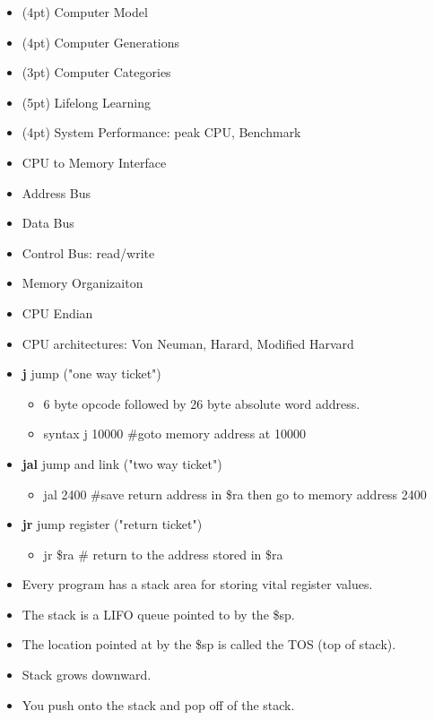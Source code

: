 
\begin{itemize}
\item (4pt) Computer Model
\item (4pt) Computer Generations
\item (3pt) Computer Categories
\item (5pt) Lifelong Learning
\item (4pt) System Performance: peak CPU, Benchmark
\end{itemize}

\begin{itemize}
\item CPU to Memory Interface
\item Address Bus
\item Data Bus
\item Control Bus: read/write
\item Memory Organizaiton
\item CPU Endian
\item CPU architectures: Von Neuman, Harard, Modified Harvard
\end{itemize}

\begin{itemize}
\item \textbf{j} jump ("one way ticket")
    \begin{itemize}
        \item 6 byte opcode followed by 26 byte absolute word address.
        \item syntax j 10000 \#goto memory address at 10000
    \end{itemize}
\item \textbf{jal} jump and link ("two way ticket")
    \begin{itemize}
        \item jal 2400 \#save return address in \$ra then go to memory address 2400
    \end{itemize}
\item \textbf{jr} jump register ("return ticket")
    \begin{itemize}
        \item jr \$ra \# return to the address stored in \$ra
    \end{itemize}
\end{itemize}

\begin{itemize}
\item Every program has a stack area for storing vital register values.
\item The stack is a LIFO queue pointed to by the \$sp.
\item The location pointed at by the \$sp is called the TOS (top of stack).
\item Stack grows downward.
\item You push onto the stack and pop off of the stack.
\end{itemize}



